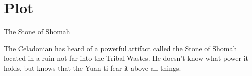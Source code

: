 \chapter{Plot}\label{ch:plot}




The Stone of Shomah

The Celadonian has heard of a powerful artifact called the Stone of Shomah located in a ruin
  not far into the Tribal Wastes.
He doesn't know what power it holds, but knows that the Yuan-ti fear it above all things.


